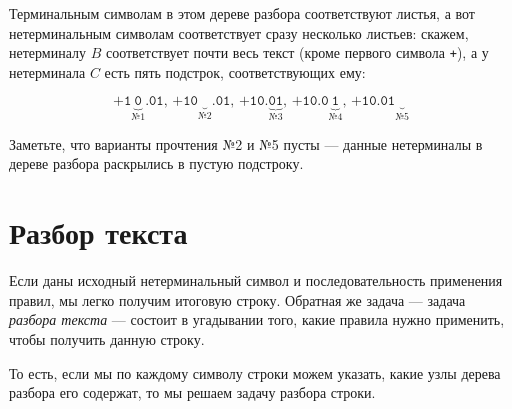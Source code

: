 \documentclass[12pt]{article}
\begin{document}
\begin{center}\end{center}

Терминальным символам в этом дереве разбора соответствуют листья,
а вот нетерминальным символам соответствует сразу несколько 
листьев: скажем, нетерминалу $B$ соответствует почти весь текст
(кроме первого символа \verb!+!), а у нетерминала $C$ есть пять
подстрок, соответствующих ему:

  $$\texttt{+1}\underbrace{\texttt{0}}_\textit{№1}\texttt{.01},\,
    \texttt{+10}\underbrace{\texttt{}}_\textit{№2}\texttt{.01},\,
    \texttt{+10.}\underbrace{\texttt{01}}_\textit{№3}\texttt{},\,
    \texttt{+10.0}\underbrace{\texttt{1}}_\textit{№4}\texttt{},\,
    \texttt{+10.01}\underbrace{\texttt{}}_\textit{№5}\texttt{}$$

Заметьте, что варианты прочтения №2 и №5 пусты --- данные нетерминалы в дереве
разбора раскрылись в пустую подстроку.

\section{Разбор текста}

Если даны исходный нетерминальный символ и последовательность применения
правил, мы легко получим итоговую строку. 
Обратная же задача --- задача \emph{разбора текста} --- состоит
в угадывании того, какие правила нужно применить, чтобы получить данную
строку. 

То есть, если мы по каждому символу строки можем указать, какие узлы
дерева разбора его содержат, то мы решаем задачу разбора строки.
\end{document}
